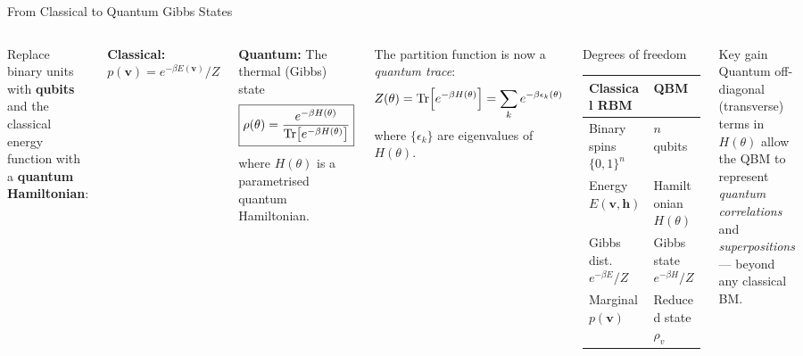 \documentclass[aspectratio=169,10pt]{beamer}
\begin{document}
\begin{frame}{From Classical to Quantum Gibbs States}
  \begin{columns}[T]
      Replace binary units with \textbf{qubits} and the
      classical energy function with a \textbf{quantum Hamiltonian}:

      \medskip
      \textbf{Classical:} $p(\mathbf{v}) = e^{-\beta E(\mathbf{v})}/Z$

      \medskip
      \textbf{Quantum:} The thermal (Gibbs) state
      \[
        \boxed{
          \rho(\theta) = \frac{e^{-\beta H(\theta)}}{\Tr[e^{-\beta H(\theta)}]}
        }
      \]
      where $H(\theta)$ is a parametrised quantum Hamiltonian.

      \medskip
      The partition function is now a \emph{quantum trace}:
      \[
        Z(\theta) = \Tr\!\left[e^{-\beta H(\theta)}\right]
        = \sum_k e^{-\beta\epsilon_k(\theta)}
      \]
      where $\{\epsilon_k\}$ are eigenvalues of $H(\theta)$.
      \begin{block}{Degrees of freedom}
        \begin{tabular}{ll}
          \toprule
          Classical RBM & QBM \\
          \midrule
          Binary spins $\{0,1\}^n$ & $n$ qubits \\
          Energy $E(\mathbf{v},\mathbf{h})$ & Hamiltonian $H(\theta)$ \\
          Gibbs dist.\ $e^{-\beta E}/Z$ & Gibbs state $e^{-\beta H}/Z$ \\
          Marginal $p(\mathbf{v})$ & Reduced state $\rho_v$ \\
          \bottomrule
        \end{tabular}
      \end{block}
      \vspace{0.2cm}
      \begin{alertblock}{Key gain}
        Quantum off-diagonal (transverse) terms in $H(\theta)$
        allow the QBM to represent \emph{quantum correlations}
        and \emph{superpositions} — beyond any classical BM.
      \end{alertblock}
  \end{columns}
\end{frame}
\end{document}
